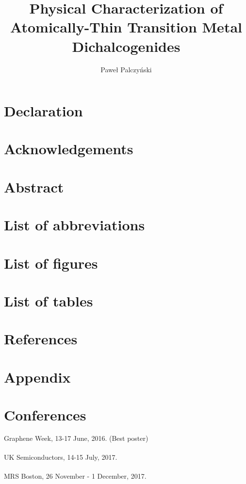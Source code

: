 \documentclass[12pt, a4paper]{report}
\author{Paweł Palczyński}
\begin{document}
\title{Physical Characterization of Atomically-Thin Transition Metal Dichalcogenides}

\tableofcontents

\maketitle

\section*{Declaration}
\section*{Acknowledgements}
\section*{Abstract}
\section*{List of abbreviations}
\section*{List of figures}
\section*{List of tables}

\newpage




	\label{sec:Introduction}









	
\section*{References}
\section*{Appendix}


\section*{Conferences}

Graphene Week, 13-17 June, 2016. (Best poster)\\ \\
UK Semiconductors, 14-15 July, 2017.\\ \\
MRS Boston, 26 November - 1 December, 2017.


{}
\end{document}
